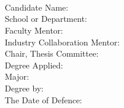 \begin{titlepage}
	\begin{center}
	\vspace*{-3em}\ 
	\\	\vspace*{5em}
	\ 
	\\[0.5em]
	\textbf{\titlethesisENG}
	\\ \vspace*{4.5em}
	\end{center}
	{\makebox[10pt][l]{}Candidate Name:\hfill\underline{\makebox[15em][c]{
	
	}}}
	\\[0.5em]
	{\makebox[10pt][l]{}School or Department:\hfill\underline{\makebox[15em][c]{
	
	}}}
	\\[0.5em]
	{\makebox[10pt][l]{}Faculty Mentor:\hfill\underline{\makebox[15em][c]{
	
	}}}
	\\[0.5em]
	{\makebox[10pt][l]{}Industry Collaboration Mentor:\hfill\underline{\makebox[15em][c]{
	
	}}}
	\\[0.5em]
	{\makebox[10pt][l]{}Chair, Thesis Committee:\hfill\underline{\makebox[15em][c]{
	
	}}}
	\\[0.5em]
	{\makebox[10pt][l]{}Degree Applied:\hfill\underline{\makebox[15em][c]{
	
	}}}
	\\[0.5em]
	{\makebox[10pt][l]{}Major:\hfill\underline{\makebox[15em][c]{
	
	}}}
	\\[0.5em]
	{\makebox[10pt][l]{}Degree by:\hfill\underline{\makebox[15em][c]{
	
	}}}
	\\[0.5em]
	{\makebox[10pt][l]{}The Date of Defence:\hfill\underline{\makebox[15em][c]{
	
	}}}
	\\[1em]
	\vspace{0em}  %
	\begin{center}

	\vfill
	
	\end{center}
\end{titlepage}